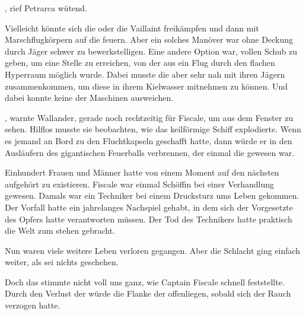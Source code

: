 \par

, rief Petrarca wütend. 

\par

Vielleicht könnte sich die  oder die Vaillaint freikämpfen und dann mit Marschflugkörpern auf die  feuern. Aber ein solches Manöver war ohne Deckung durch Jäger schwer zu bewerkstelligen. Eine andere Option war, vollen Schub zu geben, um eine Stelle zu erreichen, von der aus ein Flug durch den flachen Hyperraum möglich wurde. Dabei musste die  aber sehr nah mit ihren Jägern zusammenkommen, um diese in ihrem Kielwasser mitnehmen zu können. Und dabei konnte keine der Maschinen ausweichen.

\par

, warnte Wallander, gerade noch rechtzeitig für Fiscale, um aus dem Fenster zu sehen. Hilflos musste sie beobachten, wie das keilförmige Schiff explodierte. Wenn es jemand an Bord zu den Fluchtkapseln geschafft hatte, dann würde er in den Ausläufern des gigantischen Feuerballs verbrennen, der einmal die  gewesen war.

\par

Einhundert Frauen und Männer hatte von einem Moment auf den nächsten aufgehört zu existieren. Fiscale war einmal Schöffin bei einer Verhandlung gewesen. Damals war ein Techniker bei einem Drucksturz ums Leben gekommen. Der Vorfall hatte ein jahrelanges Nachspiel gehabt, in dem sich der Vorgesetzte des Opfers hatte verantworten müssen. Der Tod des Technikers hatte praktisch die Welt zum stehen gebracht.

\par

Nun waren viele weitere Leben verloren gegangen. Aber die Schlacht ging einfach weiter, als sei nichts geschehen.

\par

Doch das stimmte nicht voll uns ganz, wie Captain Fiscale schnell feststellte. Durch den Verlust der  würde die Flanke der  offenliegen, sobald sich der Rauch verzogen hatte.

\par

